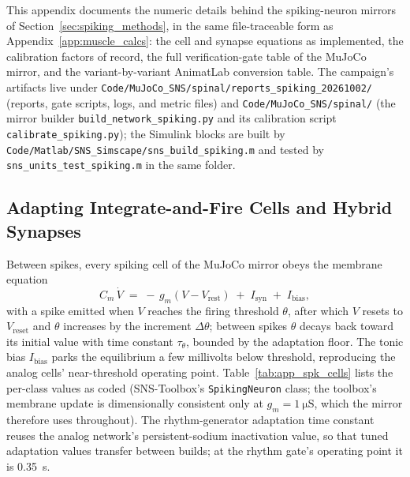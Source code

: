 This appendix documents the numeric details behind the spiking-neuron mirrors of Section~\ref{sec:spiking_methods}, in the same file-traceable form as Appendix~\ref{app:muscle_calcs}: the cell and synapse equations as implemented, the calibration factors of record, the full verification-gate table of the MuJoCo mirror, and the variant-by-variant AnimatLab conversion table. The campaign's artifacts live under \texttt{Code/MuJoCo\_SNS/spinal/reports\_spiking\_20261002/} (reports, gate scripts, logs, and metric files) and \texttt{Code/MuJoCo\_SNS/spinal/} (the mirror builder \texttt{build\_network\_spiking.py} and its calibration script \texttt{calibrate\_spiking.py}); the Simulink blocks are built by \texttt{Code/Matlab/SNS\_Simscape/sns\_build\_spiking.m} and tested by \texttt{sns\_units\_test\_spiking.m} in the same folder.

\subsection{Adapting Integrate-and-Fire Cells and Hybrid Synapses}

Between spikes, every spiking cell of the MuJoCo mirror obeys the membrane equation
\begin{equation}
    C_{m}\,\dot{V} \;=\; -\,g_{m}\left(V - V_{\text{rest}}\right)
        \;+\; I_{\text{syn}} \;+\; I_{\text{bias}},
    \label{eq:app_lif}
\end{equation}
with a spike emitted when $V$ reaches the firing threshold $\theta$, after which $V$ resets to $V_{\text{reset}}$ and $\theta$ increases by the increment $\Delta\theta$; between spikes $\theta$ decays back toward its initial value with time constant $\tau_{\theta}$, bounded by the adaptation floor. The tonic bias $I_{\text{bias}}$ parks the equilibrium a few millivolts below threshold, reproducing the analog cells' near-threshold operating point. Table~\ref{tab:app_spk_cells} lists the per-class values as coded (SNS-Toolbox's \texttt{SpikingNeuron} class; the toolbox's membrane update is dimensionally consistent only at $g_{m} = \qty{1}{\micro\siemens}$, which the mirror therefore uses throughout). The rhythm-generator adaptation time constant reuses the analog network's persistent-sodium inactivation value, so that tuned adaptation values transfer between builds; at the rhythm gate's operating point it is \qty{0.35}{\second}.


